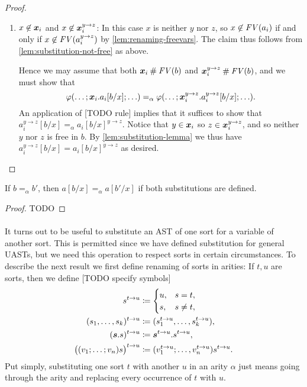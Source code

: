 \documentclass[a4paper, 11pt, article, danish, oneside]{memoir}
\DeclarePairedDelimiter{\auxdelimparen}{(}{)}
\newcommand{\defeq}{\coloneqq}
\renewcommand{\phi}{\varphi}
\newcommand{\newpar}{\paragraph{}}
\newcommand{\freevar}[2][]{\mathit{FV}\auxdelimparen[#1]{#2}}
\begin{document}
\begin{proof}
\begin{proofsec}
\begin{enumerate}
            \item $x \not\in \bm{x}_i$ and $x \not\in \bm{x}_i^{y \to z}$: In this case $x$ is neither $y$ nor $z$, so $x \not\in \freevar{a_i}$ if and only if $x \not\in \freevar{a_i^{y \to z}}$ by \cref{lem:renaming-freevars}. The claim thus follows from \cref{lem:substitution-not-free} as above.

            Hence we may assume that both $\seq{x}_i \disj \freevar{b}$ and $\seq{x}_i^{y \to z} \disj \freevar{b}$, and we must show that
            \begin{equation*}
                \phi(\ldots ; \seq{x}_i.a_i[b/x] ; \ldots)
                    =_\alpha \phi( \ldots ; \seq{x}_i^{y \to z}.a_i^{y \to z}[b/x] ; \ldots ).
            \end{equation*}
            An application of [TODO rule] implies that it suffices to show that $a_i^{y \to z}[b/x] =_\alpha a_i[b/x]^{y \to z}$. Notice that $y \in \bm{x}_i$ so $z \in \bm{x}_i^{y \to z}$, and so neither $y$ nor $z$ is free in $b$. By \cref{lem:substitution-lemma} we thus have $a_i^{y \to z}[b/x] = a_i[b/x]^{y \to z}$ as desired.
        \end{enumerate}
    \end{proofsec}
\end{proof}


\begin{lemma}
    \label{lem:substitution-alpha-2}
    If $b =_\alpha b'$, then $a[b/x] =_\alpha a[b'/x]$ if both substitutions are defined.
\end{lemma}

\begin{proof}
    TODO
\end{proof}


\newpar

It turns out to be useful to substitute an AST of one sort for a variable of another sort. This is permitted since we have defined substitution for general UASTs, but we need this operation to respect sorts in certain circumstances. To describe the next result we first define renaming of sorts in arities: If $t,u$ are sorts, then we define [TODO specify symbols]
%
\begin{align*}
    s^{t \to u}
        &\defeq \begin{cases}
            u, & s = t, \\
            s, & s \neq t,
        \end{cases} \\
    (s_1, \ldots, s_k)^{t \to u}
        &\defeq (s_1^{t \to u}, \ldots, s_k^{t \to u}), \\
    (\seq{s}.s)^{t \to u}
        &\defeq \seq{s}^{t \to u}.s^{t \to u}, \\
    \bigl( (v_1; \ldots; v_n)s \bigr)^{t \to u}
        &\defeq (v_1^{t \to u}; \ldots, v_n^{t \to u})s^{t \to u}.
\end{align*}
%
Put simply, substituting one sort $t$ with another $u$ in an arity $\alpha$ just means going through the arity and replacing every occurrence of $t$ with $u$.
\end{document}

